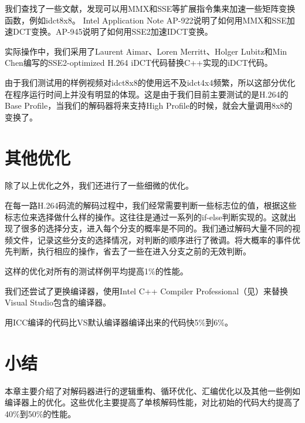 我们查找了一些文献，发现可以用MMX和SSE等扩展指令集来加速一些矩阵变换函数，例如idct8x8。
Intel Application Note AP-922\cite{intel-ap922}说明了如何用MMX和SSE加速DCT变换。AP-945\cite{intel-ap945}说明了如何用SSE2加速IDCT变换。

实际操作中，我们采用了Laurent Aimar、Loren Merritt、Holger Lubitz和Min Chen编写的SSE2-optimized H.264 iDCT代码替换C++实现的iDCT代码。

由于我们测试用的样例视频对idct8x8的使用远不及idct4x4频繁，所以这部分优化在程序运行时间上并没有明显的体现。这是由于我们目前主要测试的是H.264的Base Profile，当我们的解码器将来支持High Profile的时候，就会大量调用8x8的变换了。

\section{其他优化}
\label{sec:singlecoreothers}

除了以上优化之外，我们还进行了一些细微的优化。

在每一路H.264码流的解码过程中，我们经常需要判断一些标志位的值，根据这些标志位来选择做什么样的操作。这往往是通过一系列的if-else判断实现的。这就出现了很多的选择分支，进入每个分支的概率是不同的。我们通过解码大量不同的视频文件，记录这些分支的选择情况，对判断的顺序进行了微调。将大概率的事件优先判断，执行相应的操作，省去了一些在进入分支之前的无效判断。

这样的优化对所有的测试样例平均提高1\%的性能。

我们还尝试了更换编译器，使用Intel C++ Compiler Professional（见）来替换Visual Studio包含的编译器。

用ICC编译的代码比VS默认编译器编译出来的代码快5\%到6\%。

\section{小结}
\label{sec:sum4}
本章主要介绍了对解码器进行的逻辑重构、循环优化、汇编优化以及其他一些例如编译器上的优化。这些优化主要提高了单核解码性能，对比初始的代码大约提高了40\%到50\%的性能。